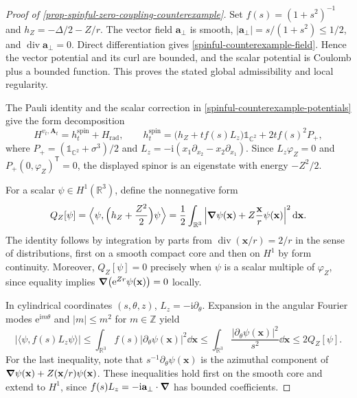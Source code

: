 \documentclass[final,reqno]{amsart}
\DeclareMathOperator{\div}{div}
\theoremstyle{remark}
\newcommand{\RR}{\mathbb{R}}
\newcommand{\CC}{\mathbb{C}}
\newcommand{\ZZ}{\mathbb{Z}}
\newcommand{\iden}{\mathbb{1}}
\renewcommand{\i}{\mathrm{i}}
\newcommand{\e}{\mathrm{e}}
\newcommand{\dua}[2]{\langle #1, #2 \rangle}
\newcommand{\rad}{\mathrm{rad}}
\let\phi=\varphi
\renewcommand{\va}{\mathbf{a}}
\newcommand{\vx}{\mathbf{x}}
\newcommand{\vA}{{\mathbf{A}}}
\begin{document}
\begin{proof}[Proof of \cref{prop-spinful-zero-coupling-counterexample}]
Set $f(s)=(1+s^2)^{-1}$ and
$h_Z=-\Delta/2-Z/r$.  The vector field $\va_\perp$ is smooth,
$|\va_\perp|=s/(1+s^2)\leq1/2$, and
$\div\va_\perp=0$.  Direct differentiation gives
\cref{spinful-counterexample-field}.  Hence the vector potential
and its curl are bounded, and the scalar potential is Coulomb plus
a bounded function.  This proves the stated global admissibility
and local regularity.

The Pauli identity and the scalar correction in
\cref{spinful-counterexample-potentials} give the form decomposition
\begin{equation*}
 H^{v_t,\vA_t}=h_t^{\mathrm{spin}}+H_\rad,\qquad
 h_t^{\mathrm{spin}}
 =\bigl(h_Z+tf(s)L_z\bigr)\iden_{\CC^2}
                        +2tf(s)^2P_+,
\end{equation*}
where $P_+=(\iden_{\CC^2}+\sigma^3)/2$ and
$L_z=-\i(x_1\partial_{x_2}-x_2\partial_{x_1})$.
Since $L_z\phi_Z=0$ and $P_+(0,\phi_Z)^{\mathsf T}=0$,
the displayed spinor is an eigenstate with energy $-Z^2/2$.

For a scalar $\psi\in H^1(\RR^3)$, define the nonnegative form
\begin{equation*}
 Q_Z[\psi]
 =\Bigl\langle\psi,\Bigl(h_Z+\frac{Z^2}{2}\Bigr)\psi\Bigr\rangle
 =\frac12\int_{\RR^3}
       \left|\grad\psi(\vx)+Z\frac{\vx}{r}\psi(\vx)\right|^2\dd\vx.
\end{equation*}
The identity follows by integration by parts from
$\div(\vx/r)=2/r$ in the sense of distributions, first on a smooth compact core
and then on $H^1$ by form continuity.  Moreover,
$Q_Z[\psi]=0$ precisely when $\psi$ is a scalar multiple of
$\phi_Z$, since equality implies
$\grad(\e^{Zr}\psi(\vx))=0$ locally.

In cylindrical coordinates $(s,\theta,z)$, $L_z=-\i\partial_\theta$.
Expansion in the angular Fourier modes $\e^{\i m\theta}$ and
$|m|\leq m^2$ for $m\in\ZZ$ yield
\begin{equation*}
 \left|\dua{\psi}{f(s)L_z\psi}\right|
 \leq\int_{\RR^3}f(s)|\partial_\theta\psi(\vx)|^2\dd\vx
 \leq\int_{\RR^3}\frac{|\partial_\theta\psi(\vx)|^2}{s^2}\dd\vx
 \leq2Q_Z[\psi].
\end{equation*}
For the last inequality, note that
$s^{-1}\partial_\theta\psi(\vx)$ is the azimuthal component of
$\grad\psi(\vx)+Z(\vx/r)\psi(\vx)$.
These inequalities hold first on the smooth core and extend to
$H^1$, since $f(s)L_z=-\i\va_\perp\cdot\grad$ has bounded
coefficients.


\end{proof}
\end{document}
